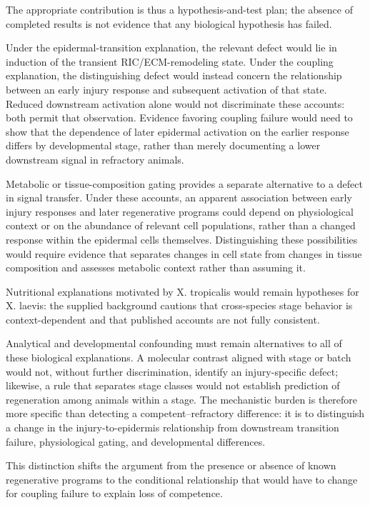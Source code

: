 \documentclass[11pt]{article}
\begin{document}
The appropriate contribution is thus a hypothesis-and-test plan; the absence of completed results is not evidence that any biological hypothesis has failed.

Under the epidermal-transition explanation, the relevant defect would lie in induction of the transient RIC/ECM-remodeling state. Under the coupling explanation, the distinguishing defect would instead concern the relationship between an early injury response and subsequent activation of that state. Reduced downstream activation alone would not discriminate these accounts: both permit that observation. Evidence favoring coupling failure would need to show that the dependence of later epidermal activation on the earlier response differs by developmental stage, rather than merely documenting a lower downstream signal in refractory animals.

Metabolic or tissue-composition gating provides a separate alternative to a defect in signal transfer. Under these accounts, an apparent association between early injury responses and later regenerative programs could depend on physiological context or on the abundance of relevant cell populations, rather than a changed response within the epidermal cells themselves. Distinguishing these possibilities would require evidence that separates changes in cell state from changes in tissue composition and assesses metabolic context rather than assuming it.

Nutritional explanations motivated by X. tropicalis would remain hypotheses for X. laevis: the supplied background cautions that cross-species stage behavior is context-dependent and that published accounts are not fully consistent.

Analytical and developmental confounding must remain alternatives to all of these biological explanations. A molecular contrast aligned with stage or batch would not, without further discrimination, identify an injury-specific defect; likewise, a rule that separates stage classes would not establish prediction of regeneration among animals within a stage. The mechanistic burden is therefore more specific than detecting a competent–refractory difference: it is to distinguish a change in the injury-to-epidermis relationship from downstream transition failure, physiological gating, and developmental differences.

This distinction shifts the argument from the presence or absence of known regenerative programs to the conditional relationship that would have to change for coupling failure to explain loss of competence.
\end{document}
